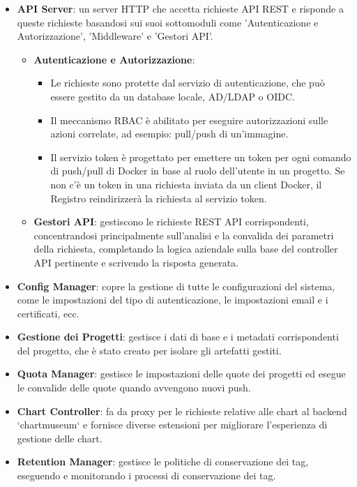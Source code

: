 \documentclass[12pt]{report}
\begin{document}
\begin{itemize}
  \item \textbf{API Server}: un server HTTP che accetta richieste API REST e risponde a queste richieste basandosi sui suoi sottomoduli come 'Autenticazione e Autorizzazione', 'Middleware' e 'Gestori API'.
  \begin{itemize}
    \item \textbf{Autenticazione e Autorizzazione}:
    \begin{itemize}
      \item Le richieste sono protette dal servizio di autenticazione, che può essere gestito da un database locale, AD/LDAP o OIDC.
      \item Il meccanismo RBAC è abilitato per eseguire autorizzazioni sulle azioni correlate, ad esempio: pull/push di un'immagine.
      \item Il servizio token è progettato per emettere un token per ogni comando di push/pull di Docker in base al ruolo dell'utente in un progetto. Se non c'è un token in una richiesta inviata da un client Docker, il Registro reindirizzerà la richiesta al servizio token.
    \end{itemize}
    \item \textbf{Gestori API}: gestiscono le richieste REST API corrispondenti, concentrandosi principalmente sull'analisi e la convalida dei parametri della richiesta, completando la logica aziendale sulla base del controller API pertinente e scrivendo la risposta generata.
  \end{itemize}
  \item \textbf{Config Manager}: copre la gestione di tutte le configurazioni del sistema, come le impostazioni del tipo di autenticazione, le impostazioni email e i certificati, ecc.
  \item \textbf{Gestione dei Progetti}: gestisce i dati di base e i metadati corrispondenti del progetto, che è stato creato per isolare gli artefatti gestiti.
  \item \textbf{Quota Manager}: gestisce le impostazioni delle quote dei progetti ed esegue le convalide delle quote quando avvengono nuovi push.
  \item \textbf{Chart Controller}: fa da proxy per le richieste relative alle chart al backend `chartmuseum` e fornisce diverse estensioni per migliorare l'esperienza di gestione delle chart.
  \item \textbf{Retention Manager}: gestisce le politiche di conservazione dei tag, eseguendo e monitorando i processi di conservazione dei tag.

\end{itemize}
\end{document}
